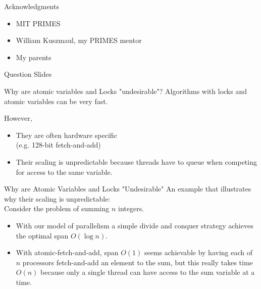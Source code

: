 \documentclass[xcolor=x11names, svgnames, rgb]{beamer}
\begin{document}
\begin{frame}[t]{Acknowledgments}
\begin{itemize}
	\item {MIT PRIMES}
	\item {William Kuszmaul, my PRIMES mentor}
	\item {My parents}
\end{itemize}
\end{frame}


\begin{frame}[t]{}
	\vfill
	\begin{center}
		{\Huge Question Slides}
	\end{center}
	\vfill
\end{frame}

\begin{frame}[t]{Why are atomic variables and Locks "undesirable"?}
	\vspace{0.5cm}
Algorithms with locks and atomic variables can be very fast.\\
\vspace{0.5cm}

However,
\begin{itemize}
	\item They are often hardware specific \\
		{\color{blue} (e.g. 128-bit fetch-and-add)}
	\item Their scaling is unpredictable because threads have to queue when competing for access to the same variable.
\end{itemize}

\end{frame}

\begin{frame}[t]{Why are Atomic Variables and Locks "Undesirable"}
\vspace{0.5cm}
An example that illustrates why their scaling is unpredictable:\\
Consider the problem of summing $n$ integers.\\
\vspace{0.5cm}

\begin{itemize}
	\item With our model of parallelism a simple divide and conquer strategy achieves the optimal span $O(\log n)$. 
	\item With atomic-fetch-and-add, span $O(1)$ seems achievable by having each of $n$ processors fetch-and-add an element to the sum, but this really takes time $O(n)$ because only a single thread can have access to the sum variable at a time.
\end{itemize}
\end{frame}
\end{document}
